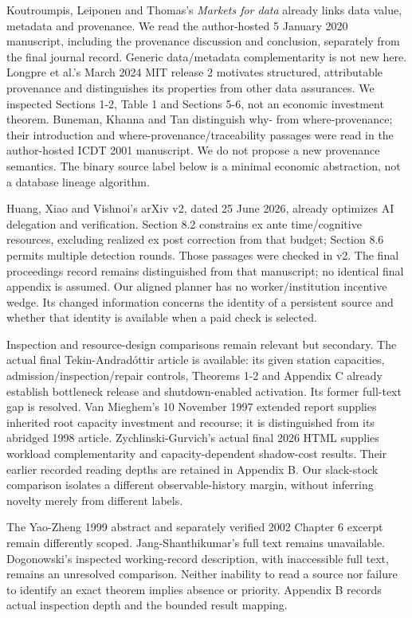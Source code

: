 \documentclass[
  11pt,
  a4paper,
]{article}
\begin{document}
Koutroumpis, Leiponen and Thomas's \emph{Markets for data} already links
data value, metadata and provenance. We read the author-hosted 5 January
2020 manuscript, including the provenance discussion and conclusion,
separately from the final journal record. Generic data/metadata
complementarity is not new here. Longpre et al.'s March 2024 MIT release
2 motivates structured, attributable provenance and distinguishes its
properties from other data assurances. We inspected Sections 1-2, Table
1 and Sections 5-6, not an economic investment theorem. Buneman, Khanna
and Tan distinguish why- from where-provenance; their introduction and
where-provenance/traceability passages were read in the author-hosted
ICDT 2001 manuscript. We do not propose a new provenance semantics. The
binary source label below is a minimal economic abstraction, not a
database lineage algorithm.

Huang, Xiao and Vishnoi's arXiv v2, dated 25 June 2026, already
optimizes AI delegation and verification. Section 8.2 constrains ex ante
time/cognitive resources, excluding realized ex post correction from
that budget; Section 8.6 permits multiple detection rounds. Those
passages were checked in v2. The final proceedings record remains
distinguished from that manuscript; no identical final appendix is
assumed. Our aligned planner has no worker/institution incentive wedge.
Its changed information concerns the identity of a persistent source and
whether that identity is available when a paid check is selected.

Inspection and resource-design comparisons remain relevant but
secondary. The actual final Tekin-Andradóttir article is available: its
given station capacities, admission/inspection/repair controls, Theorems
1-2 and Appendix C already establish bottleneck release and
shutdown-enabled activation. Its former full-text gap is resolved. Van
Mieghem's 10 November 1997 extended report supplies inherited root
capacity investment and recourse; it is distinguished from its abridged
1998 article. Zychlinski-Gurvich's actual final 2026 HTML supplies
workload complementarity and capacity-dependent shadow-cost results.
Their earlier recorded reading depths are retained in Appendix B. Our
slack-stock comparison isolates a different observable-history margin,
without inferring novelty merely from different labels.

The Yao-Zheng 1999 abstract and separately verified 2002 Chapter 6
excerpt remain differently scoped. Jang-Shanthikumar's full text remains
unavailable. Dogonowski's inspected working-record description, with
inaccessible full text, remains an unresolved comparison. Neither
inability to read a source nor failure to identify an exact theorem
implies absence or priority. Appendix B records actual inspection depth
and the bounded result mapping.
\end{document}
